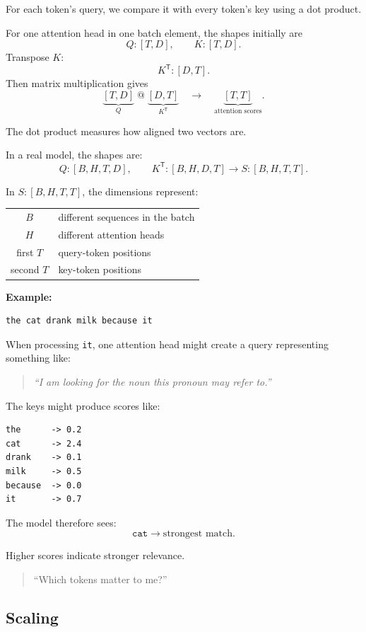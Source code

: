 For each token's query, we compare it with every token's key using a dot product.

For one attention head in one batch element, the shapes initially are
\[
  Q:[T,D],
  \qquad
  K:[T,D].
\]
Transpose \(K\):
\[
  K^{\mathsf T}:[D,T].
\]
Then matrix multiplication gives
\[
  \underbrace{[T,D]}_{Q}
  \;@\;
  \underbrace{[D,T]}_{K^{\mathsf T}}
  \quad\longrightarrow\quad
  \underbrace{[T,T]}_{\text{attention scores}}.
\]

The dot product measures how aligned two vectors are.

In a real model, the shapes are:
\[
  Q:[B,H,T,D],\qquad
  K^{\mathsf T}:[B,H,D,T]
  \longrightarrow S:[B,H,T,T].
\]

In \(S:[B,H,T,T]\), the dimensions represent:
\begin{center}
\begin{tabular}{@{}cl@{}}
  \(B\) & different sequences in the batch \\
  \(H\) & different attention heads \\
  first \(T\) & query-token positions \\
  second \(T\) & key-token positions
\end{tabular}
\end{center}

\textbf{Example:}

\begin{verbatim}
the cat drank milk because it
\end{verbatim}

When processing \texttt{it}, one attention head might create a query
representing something like:
\begin{quote}
  \emph{``I am looking for the noun this pronoun may refer to.''}
\end{quote}

The keys might produce scores like:
\begin{verbatim}
the      -> 0.2
cat      -> 2.4
drank    -> 0.1
milk     -> 0.5
because  -> 0.0
it       -> 0.7
\end{verbatim}

The model therefore sees:
\[
  \texttt{cat}\longrightarrow\text{strongest match}.
\]

Higher scores indicate stronger relevance.

\begin{quote}
  ``Which tokens matter to me?''
\end{quote}

\subsection{Scaling}

